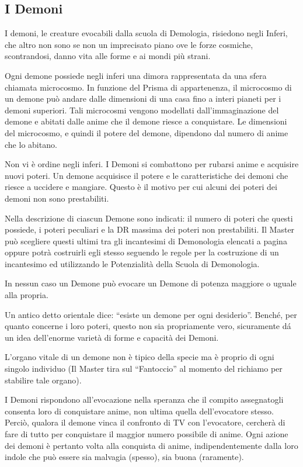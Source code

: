 \subsection{I Demoni}
\label{demoni} 

I demoni, le creature evocabili dalla scuola di Demologia, risiedono
negli Inferi, che altro non sono se non un imprecisato piano ove le
forze cosmiche, scontrandosi, danno vita alle forme e ai mondi pi\`u
strani.

Ogni demone possiede negli inferi una dimora rappresentata da una
sfera chiamata microcosmo. In funzione del Prisma di appartenenza, il
microcosmo di un demone pu\`o andare dalle dimensioni di una casa
fino a interi pianeti per i demoni superiori. Tali microcosmi vengono
modellati dall'immaginazione del demone e abitati dalle anime che il
demone riesce a conquistare. Le dimensioni del microcosmo, e quindi il
potere del demone, dipendono dal numero di anime che lo abitano.

Non vi \`e ordine negli inferi. I Demoni si combattono per rubarsi
anime e acquisire nuovi poteri. Un demone acquisisce il potere e le
caratteristiche dei demoni che riesce a uccidere e mangiare. Questo
\`e il motivo per cui alcuni dei poteri dei demoni non sono
prestabiliti.

Nella descrizione di ciascun Demone sono indicati: il numero di poteri
che questi possiede, i poteri peculiari e la DR massima dei poteri
non prestabiliti.  Il Master pu\`o scegliere questi ultimi tra gli
incantesimi di Demonologia elencati a pagina \pageref{incdemonologia}
oppure potr\`a costruirli egli stesso seguendo le regole per la
costruzione di un incantesimo ed utilizzando le Potenzialit\`a della
Scuola di Demonologia.

In nessun caso un Demone pu\`o evocare un Demone di potenza maggiore
o uguale alla propria.

Un antico detto orientale dice: ``esiste un demone per ogni
desiderio''. Bench\'e, per quanto concerne i loro poteri, questo non sia
propriamente vero, sicuramente d\'a un idea dell'enorme variet\`a di
forme e capacit\`a dei Demoni.

L'organo vitale di un demone non \`e tipico della specie ma \`e
proprio di ogni singolo individuo (Il Master tira sul ``Fantoccio'' al
momento del richiamo per stabilire tale organo).

I Demoni rispondono all'evocazione nella speranza che il compito
assegnatogli consenta loro di conquistare anime, non ultima quella
dell'evocatore stesso.  Perci\`o, qualora il demone vinca il
confronto di TV con l'evocatore, cercher\`a di fare di tutto per
conquistare il maggior numero possibile di anime. Ogni azione dei
demoni \`e pertanto volta alla conquista di anime, indipendentemente
dalla loro indole che pu\`o essere sia malvagia (spesso), sia buona
(raramente).

